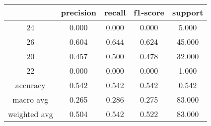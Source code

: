 \begin{table}[htb]
    \centering
    \begin{tabular}{@{}ccccc@{}}
        \toprule
         & precision & recall & f1-score & support \\
        \midrule
        24 & 0.000 & 0.000 & 0.000 & 5.000 \\
        26 & 0.604 & 0.644 & 0.624 & 45.000 \\
        20 & 0.457 & 0.500 & 0.478 & 32.000 \\
        22 & 0.000 & 0.000 & 0.000 & 1.000 \\
        accuracy & 0.542 & 0.542 & 0.542 & 0.542 \\
        macro avg & 0.265 & 0.286 & 0.275 & 83.000 \\
        weighted avg & 0.504 & 0.542 & 0.522 & 83.000 \\
        \bottomrule
    \end{tabular}
\end{table}